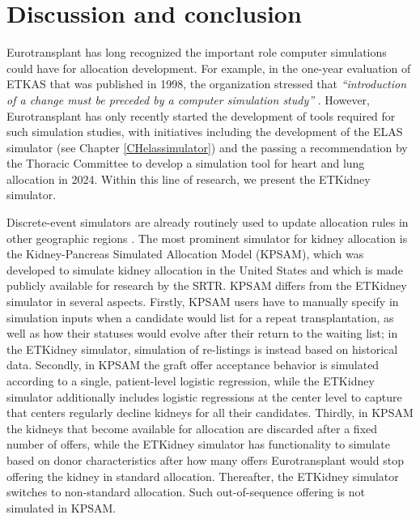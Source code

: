 \documentclass[11pt,twoside,]{book}
\begin{document}
\FloatBarrier

\section{Discussion and conclusion}\label{sec:etkidneydiscussion}

Eurotransplant has long recognized the important role computer simulations could have for
allocation development. For example, in the one-year evaluation of ETKAS that was
published in 1998, the organization stressed that \emph{``introduction of a change must be
preceded by a computer simulation study''}
\citep{demeesterNewEurotransplantKidney1998}. However, Eurotransplant has
only recently started the development of tools required for such
simulation studies, with initiatives including the development of the ELAS simulator
(see Chapter \ref{CHelassimulator}) and the passing a recommendation by the Thoracic
Committee to develop a simulation tool for heart and lung allocation in 2024.
Within this line of research, we present the ETKidney
simulator.

Discrete-event simulators are already routinely used to update allocation rules in other
geographic regions
\citep{Pritsker1995, Mumford2018, jacquelinetChangingKidneyAllocation2006}.
The most prominent simulator for kidney allocation is the Kidney-Pancreas Simulated Allocation
Model (KPSAM), which was developed to simulate kidney allocation in the United States and which is made publicly available for research by the SRTR. KPSAM differs
from the ETKidney simulator in several aspects. Firstly, KPSAM users have to
manually specify in simulation inputs when a candidate would list for a
repeat transplantation, as well as how their statuses would
evolve after their return to the waiting list; in the ETKidney simulator, simulation of re-listings is instead
based on historical data. Secondly, in KPSAM the graft offer acceptance behavior is
simulated according to a single, patient-level logistic regression, while the ETKidney simulator additionally includes logistic
regressions at the center level to capture that centers regularly
decline kidneys for all their candidates. Thirdly, in KPSAM the kidneys that
become available for allocation are discarded after a fixed number of offers, while
the ETKidney simulator has functionality to simulate based on donor characteristics
after how many offers Eurotransplant would stop offering the kidney in standard allocation.
Thereafter, the ETKidney simulator switches to non-standard
allocation. Such out-of-sequence offering is not simulated in
KPSAM.
\end{document}
